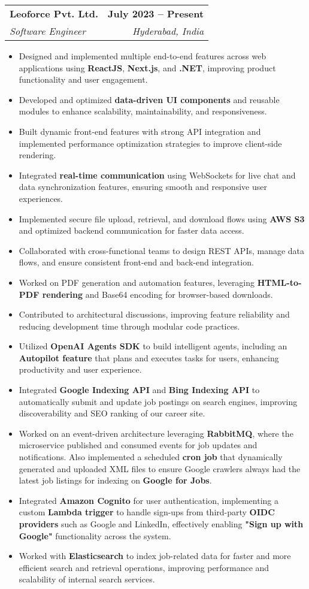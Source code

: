 \documentclass[letterpaper,11pt]{article}
\makeatletter
\newcommand{\resumeItem}[1]{\item\small{{#1 \vspace{-2pt}}}}
\newcommand{\resumeSubheading}[4]{
  \vspace{-2pt}\item
    \begin{tabular*}{1.0\textwidth}[t]{l@{\extracolsep{\fill}}r}
      \textbf{#1} & \textbf{\small #2} \\
      \textit{\small#3} & \textit{\small #4} \\
    \end{tabular*}\vspace{-7pt}
}
\newcommand{\resumeItemListStart}{\begin{itemize}}
\newcommand{\resumeItemListEnd}{\end{itemize}\vspace{-5pt}}
\makeatother
\begin{document}
\resumeSubheading
  {Leoforce Pvt. Ltd.}{July 2023 -- Present}
  {Software Engineer}{Hyderabad, India}
  \resumeItemListStart
    \resumeItem{Designed and implemented multiple end-to-end features across web applications using \textbf{ReactJS}, \textbf{Next.js}, and \textbf{.NET}, improving product functionality and user engagement.}
    \resumeItem{Developed and optimized \textbf{data-driven UI components} and reusable modules to enhance scalability, maintainability, and responsiveness.}
    \resumeItem{Built dynamic front-end features with strong API integration and implemented performance optimization strategies to improve client-side rendering.}
    \resumeItem{Integrated \textbf{real-time communication} using WebSockets for live chat and data synchronization features, ensuring smooth and responsive user experiences.}
    \resumeItem{Implemented secure file upload, retrieval, and download flows using \textbf{AWS S3} and optimized backend communication for faster data access.}
    \resumeItem{Collaborated with cross-functional teams to design REST APIs, manage data flows, and ensure consistent front-end and back-end integration.}
    \resumeItem{Worked on PDF generation and automation features, leveraging \textbf{HTML-to-PDF rendering} and Base64 encoding for browser-based downloads.}
    \resumeItem{Contributed to architectural discussions, improving feature reliability and reducing development time through modular code practices.}
    \resumeItem{Utilized \textbf{OpenAI Agents SDK} to build intelligent agents, including an \textbf{Autopilot feature} that plans and executes tasks for users, enhancing productivity and user experience.}
    \resumeItem{Integrated \textbf{Google Indexing API} and \textbf{Bing Indexing API} to automatically submit and update job postings on search engines, improving discoverability and SEO ranking of our career site.}
    \resumeItem{Worked on an event-driven architecture leveraging \textbf{RabbitMQ}, where the microservice published and consumed events for job updates and notifications. Also implemented a scheduled \textbf{cron job} that dynamically generated and uploaded XML files to ensure Google crawlers always had the latest job listings for indexing on \textbf{Google for Jobs}.}
    \resumeItem{Integrated \textbf{Amazon Cognito} for user authentication, implementing a custom \textbf{Lambda trigger} to handle sign-ups from third-party \textbf{OIDC providers} such as Google and LinkedIn, effectively enabling \textbf{"Sign up with Google"} functionality across the system.}
    \resumeItem{Worked with \textbf{Elasticsearch} to index job-related data for faster and more efficient search and retrieval operations, improving performance and scalability of internal search services.}
  \resumeItemListEnd
\end{document}
